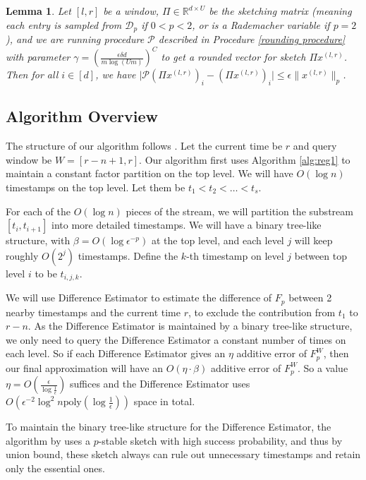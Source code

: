 \documentclass{article}
\newcommand{\dif}{\textsf{Difference Estimator }}
\newcommand{\diff}{\textsf{Difference Estimator}}
\theoremstyle{plain}
\newtheorem{lem}[theorem]{Lemma}
\begin{document}
\begin{lem}\label{rounding lemma}
    Let $[l, r]$ be a window, $\Pi \in \mathbb{R} ^ {d\times U}$ be the sketching matrix (meaning each entry is sampled from $\mathcal{D}_p$ if $0 < p < 2$, or is a Rademacher variable if $p = 2$), and we are running procedure $\mathcal{P}$ described in Procedure \ref{rounding procedure} with parameter $\gamma = (\frac{\epsilon \delta d}{m\log (Um)}) ^ C$ to get a rounded vector for sketch $\Pi x ^ {(l,r)}$. Then for all $i\in [d]$, we have $\Big|\mathcal{P}(\Pi x ^ {(l,r)})_i - (\Pi x ^ {(l,r)})_i\Big| \le \epsilon \|x ^ {(l, r)}\|_p$. 
\end{lem}

%
 \subsection{Algorithm Overview} 







The structure of our algorithm follows \cite{woodruff2022tight}. Let the current time be $r$ and query window be $W = [r-n+1,r]$. Our algorithm first uses Algorithm \ref{alg:reg1} to maintain a constant factor partition on the top level. We will have $O(\log n)$ timestamps on the top level. Let them be $t_1< t_2< \dots< t_s$. 

For each of the $O(\log n)$ pieces of the stream, we will partition the substream $[t_i, t_{i + 1}]$ into more detailed timestamps. We will have a binary tree-like structure, with $\beta = O(\log \epsilon ^ {-p})$ at the top level, and each level $j$ will keep roughly $O(2 ^ j)$ timestamps. Define the $k$-th timestamp on level $j$ between top level $i$ to be $t_{i, j, k}$. 

We will use \dif to estimate the difference of $F_p$ between 2 nearby timestamps and the current time $r$, to exclude the contribution from $t_1$ to $r-n$. As the \dif is maintained by a binary tree-like structure, we only need to query the \dif a constant number of times on each level. So if each \dif gives an $\eta$ additive error of $F_p ^ W$, then our final approximation will have an $O(\eta \cdot \beta)$ additive error of $F_p ^ W$. So a value $\eta = O(\frac {\epsilon}{\log \frac 1{\epsilon}})$ suffices and the \dif uses $O(\epsilon ^ {-2} \log ^ 2n \text{poly}(\log \frac 1{\epsilon}))$ space in total. 

To maintain the binary tree-like structure for the \diff, the algorithm by \cite{woodruff2022tight} uses a $p$-stable sketch with high success probability, and thus by union bound, these sketch always can rule out unnecessary timestamps and retain only the essential ones. 
\end{document}
